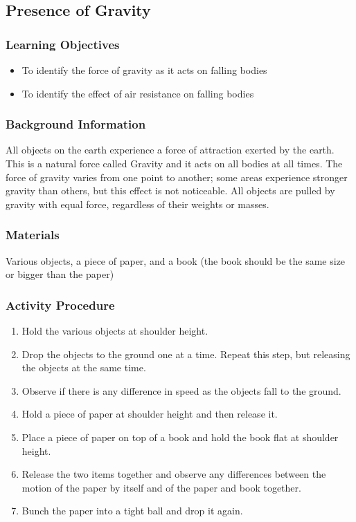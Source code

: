 
\subsection{Presence of Gravity}

\subsubsection*{Learning Objectives}
\begin{itemize}
\item{To identify the force of gravity as it acts on falling bodies} 
\item{To identify the effect of air resistance on falling bodies} 
\end{itemize}

\subsubsection*{Background Information}
All objects on the earth experience a force of attraction exerted by the earth.  This is a natural force called Gravity and it acts on all bodies at all times.  The force of gravity varies from one point to another; some areas experience stronger gravity than others, but this effect is not noticeable.  All objects are pulled by gravity with equal force, regardless of their weights or masses.

\subsubsection*{Materials}
Various objects, a piece of paper, and a book (the book should be the same size or bigger than the paper)

\subsubsection*{Activity Procedure}
\begin{enumerate}
\item{Hold the various objects at shoulder height.} 
\item{Drop the objects to the ground one at a time. Repeat this step, but releasing the objects at the same time.} 
\item{Observe if there is any difference in speed as the objects fall to the ground.} 
\item{Hold a piece of paper at shoulder height and then release it.} 
\item{Place a piece of paper on top of a book and hold the book flat at shoulder height.} 
\item{Release the two items together and observe any differences between the motion of the paper by itself and of the paper and book together.} 
\item{Bunch the paper into a tight ball and drop it again.}
\end{enumerate}

